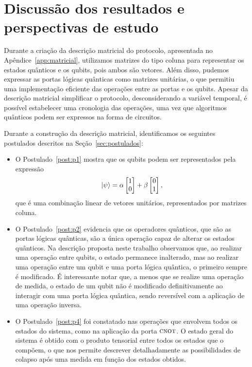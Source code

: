 \chapter{Discussão dos resultados e perspectivas de estudo}\label{sec:resultados}

Durante a criação da descrição matricial do protocolo, apresentada no Apêndice~\ref{app:matricial}, utilizamos matrizes do tipo coluna para representar os estados quânticos e os qubits, pois ambos são vetores. Além disso, pudemos expressar as portas lógicas quânticas como matrizes unitárias, o que permitiu uma implementação eficiente das operações entre as portas e os qubits. Apesar da descrição matricial simplificar o protocolo, desconsiderando a variável temporal, é possível estabelecer uma cronologia das operações, uma vez que algoritmos quânticos podem ser expressos na forma de circuitos.

Durante a construção da descrição matricial, identificamos os seguintes postulados descritos na Seção~\ref{sec:postulados}:
\begin{itemize}
  \item O Postulado~\ref{post:p1} mostra que os qubits podem ser representados pela expressão
        \[
        \ket{\psi} =
        \alpha \begin{bmatrix} 1 \\ 0 \end{bmatrix} +
        \beta \begin{bmatrix} 0 \\ 1 \end{bmatrix},
        \]
        que é uma combinação linear de vetores unitários, representados por matrizes coluna.

  \item O Postulado~\ref{post:p2} evidencia que os operadores quânticos, que são as portas lógicas quânticas, são a única operação capaz de alterar os estados quânticos. Na descrição proposta neste trabalho observamos que, ao realizar uma operação entre qubits, o estado permanece inalterado, mas ao realizar uma operação entre um qubit e uma porta lógica quântica, o primeiro sempre é modificado. É interessante notar que, a menos que se realize uma operação de medida, o estado de um qubit não é modificado definitivamente ao interagir com uma porta lógica quântica, sendo reversível com a aplicação de uma operação inversa.

  \item O Postulado~\ref{post:p4} foi constatado nas operações que envolvem todos os estados do sistema, como na aplicação da porta \(\operatorname{\textsc{cnot}}\). O estado geral do sistema é obtido com o produto tensorial entre todos os estados que o compõem, o que nos permite descrever detalhadamente as possibilidades de colapso após uma medida em função dos estados obtidos.
\end{itemize}

